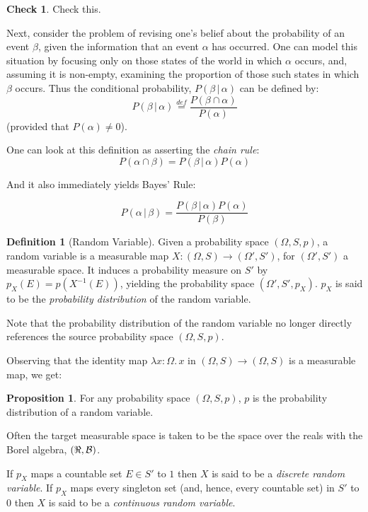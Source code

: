 \documentclass{article}
\newcommand{\alt}{\,|\,}
\newcommand{\defeq}{\stackrel{{\scriptscriptstyle def}}{=}}
\theoremstyle{definition}
\newtheorem{definition}{Definition}[section]
\newtheorem{proposition}[theorem]{Proposition}
\newtheorem*{CHECK}{{\sc Check}}
\begin{document}
\begin{CHECK}
  Check this.
\end{CHECK}

Next, consider the problem of revising one's belief about the probability of an event \(\beta\), given the information that an event \(\alpha\) has occurred. One can model this situation by focusing only on those states of the world in which \(\alpha\) occurs, and, assuming it is non-empty, examining the proportion of those such states in which \(\beta\) occurs. Thus the conditional probability, \(P(\beta\alt \alpha)\) can be defined by:
\[ P(\beta \alt \alpha) \defeq \frac{P(\beta \cap \alpha)}{P(\alpha)}
\]
\noindent (provided that \(P(\alpha)\not= 0\)). 

One can look at this definition as asserting the {\em chain rule}:
\[
P(\alpha \cap \beta)=P(\beta \alt \alpha) P(\alpha)
\]

And it also immediately yields Bayes' Rule:

\[ P(\alpha \alt \beta) = \frac{P(\beta \alt \alpha) P(\alpha)}{P(\beta)}
\]


\begin{definition}[Random Variable]
  Given a probability space \((\Omega, S, p)\), a random variable is a measurable map \(X:(\Omega,S) \rightarrow (\Omega', S')\), for \((\Omega', S')\) a measurable space. It induces a probability measure on \(S'\) by \(p_X(E)=p(X^{-1}(E))\), yielding the probability space \((\Omega',S', p_X)\). \(p_X\) is said to be the {\em probability distribution} of the random variable.
\end{definition}
Note that the probability distribution of the random variable no longer directly references the source probability space \((\Omega, S, p)\).

Observing that the identity map \(\lambda x : \Omega.\,x\) in \((\Omega,S)\rightarrow (\Omega,S)\) is a
measurable map, we get:

\begin{proposition}
  For any probability space \((\Omega, S, p)\), \(p\) is the probability distribution of a random variable.
\end{proposition}


Often the target measurable space is taken to be the space over the reals with the Borel algebra, \((\Re,{\cal B})\).

If \(p_X\) maps a countable set \(E \in S'\) to \(1\) then \(X\) is said to be a {\em discrete random variable}. If \(p_X\) maps every singleton set (and, hence, every countable set) in \(S'\) to \(0\) then \(X\) is said to be a {\em continuous random variable}.
\end{document}
